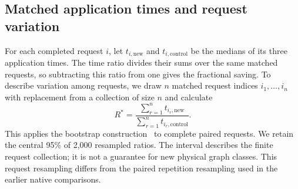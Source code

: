 \subsection{Matched application times and request variation}
For each completed request $i$, let $t_{i,\mathrm{new}}$ and $t_{i,\mathrm{control}}$ be the medians of its three application times. The time ratio divides their sums over the same matched requests, so subtracting this ratio from one gives the fractional saving. To describe variation among requests, we draw $n$ matched request indices $i_1,\ldots,i_n$ with replacement from a collection of size $n$ and calculate
\begin{equation}
 R^*=\frac{\sum_{r=1}^{n}t_{i_r,\mathrm{new}}}
 {\sum_{r=1}^{n}t_{i_r,\mathrm{control}}}.
 \label{eq:loop-tree-resampling}
\end{equation}
This applies the bootstrap construction~\cite{Efron1979} to complete paired requests. We retain the central 95\% of 2,000 resampled ratios. The interval describes the finite request collection; it is not a guarantee for new physical graph classes. This request resampling differs from the paired repetition resampling used in the earlier native comparisons.
